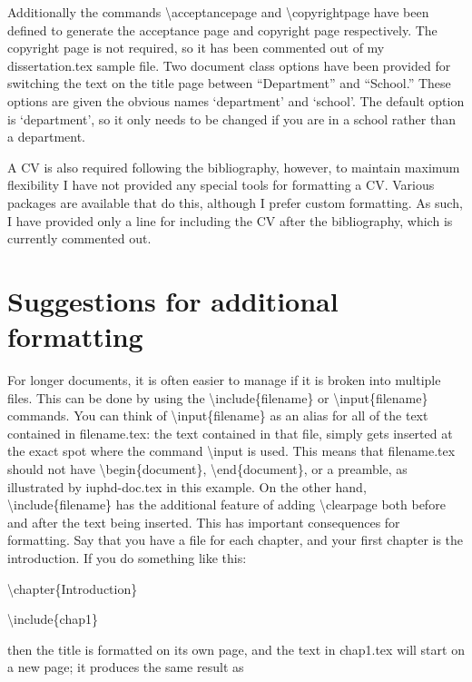 Additionally the commands \textbackslash acceptancepage and \textbackslash copyrightpage have been defined to generate the acceptance page and copyright page
respectively.  The copyright page is not required, so it has been commented out of my dissertation.tex sample file.  Two document class options have been provided
for switching the text on the title page between ``Department'' and ``School.''  These options are given the obvious names `department' and `school'. The
default option is `department', so it only needs to be changed if you are in a school rather than a department.

A CV is also required following the bibliography, however, to maintain maximum flexibility I have not provided any special tools for
formatting a CV.  Various packages are available that do this, although I prefer custom formatting. As such, I have provided only a
line for including the CV after the bibliography, which is currently commented out.



\section{Suggestions for additional formatting}

For longer documents, it is often easier to manage if it is broken into multiple files.  This can be done by using the
\textbackslash include\{filename\} or \textbackslash input\{filename\} commands.  You can think of
\textbackslash input\{filename\} as an alias for all of the text contained in filename.tex: the text contained in that file,
simply gets inserted at the exact spot where the command \textbackslash input is used.  This means that filename.tex should not have
\textbackslash begin\{document\}, \textbackslash end\{document\}, or a preamble, as illustrated by iuphd-doc.tex in this example.
On the other hand, \textbackslash include\{filename\} has the additional feature of adding \textbackslash clearpage both before and after
the text being inserted.  This has important consequences for formatting.  Say that you have a file for each chapter,
and your first chapter is the introduction.  If you do something like this:
\medskip

\textbackslash chapter\{Introduction\}

\textbackslash include\{chap1\}
\medskip

\noindent then the title is formatted on its own page, and the text in chap1.tex will start on a new page; it produces
the same result as
\medskip

